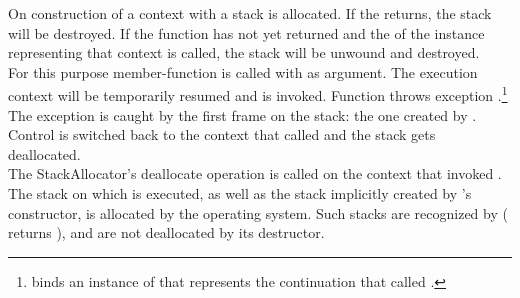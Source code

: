 \label{subsec:destruction}
On construction of a context with \callcc a stack is allocated. If the
\entryfn returns, the stack will be destroyed. If the function has not
yet returned and the  of the \cont instance
representing that context is called, the stack will be unwound and destroyed.\\

For this purpose member-function \resumewith is called with \unwindcont
as argument. The execution context will be temporarily
resumed and \unwindcont is invoked. Function \unwindcont throws exception
\unwindex.\footnote{\unwindex binds an instance of \cont that represents the
continuation that called \resumewith.} The exception
is caught by the first frame on the stack: the one created by
\callcc. Control is switched back to the context that called
\dtor and the stack gets deallocated.\\

The StackAllocator's deallocate operation is called on the context that
invoked \dtor.\\

The stack on which  is executed, as well as the stack implicitly
created by 's constructor, is allocated by the operating
system. Such stacks are recognized by \cont (\anythread
returns ), and are not deallocated by its destructor.



